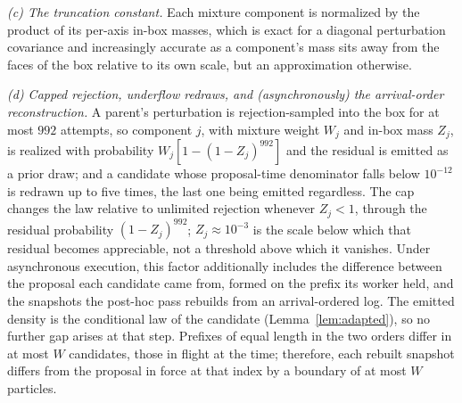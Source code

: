 \documentclass[10pt]{article}
\theoremstyle{plain}
\theoremstyle{definition}
\begin{document}
\emph{(c) The truncation constant.} Each mixture component is normalized by the product of its per-axis in-box masses, which is exact for a diagonal perturbation covariance and increasingly accurate as a component's mass sits away from the faces of the box relative to its own scale, but an approximation otherwise.

\emph{(d) Capped rejection, underflow redraws, and (asynchronously) the arrival-order reconstruction.} A parent's perturbation is rejection-sampled into the box for at most $992$ attempts, so component $j$, with mixture weight $W_j$ and in-box mass $Z_j$, is realized with probability $W_j[1-(1-Z_j)^{992}]$ and the residual is emitted as a prior draw; and a candidate whose proposal-time denominator falls below $10^{-12}$ is redrawn up to five times, the last one being emitted regardless. The cap changes the law relative to unlimited rejection whenever $Z_j<1$, through the residual probability $(1-Z_j)^{992}$; $Z_j\approx10^{-3}$ is the scale below which that residual becomes appreciable, not a threshold above which it vanishes. Under asynchronous execution, this factor additionally includes the difference between the proposal each candidate came from, formed on the prefix its worker held, and the snapshots the post-hoc pass rebuilds from an arrival-ordered log. The emitted density is the conditional law of the candidate (Lemma~\ref{lem:adapted}), so no further gap arises at that step. Prefixes of equal length in the two orders differ in at most $W$ candidates, those in flight at the time; therefore, each rebuilt snapshot differs from the proposal in force at that index by a boundary of at most $W$ particles.
\end{document}
